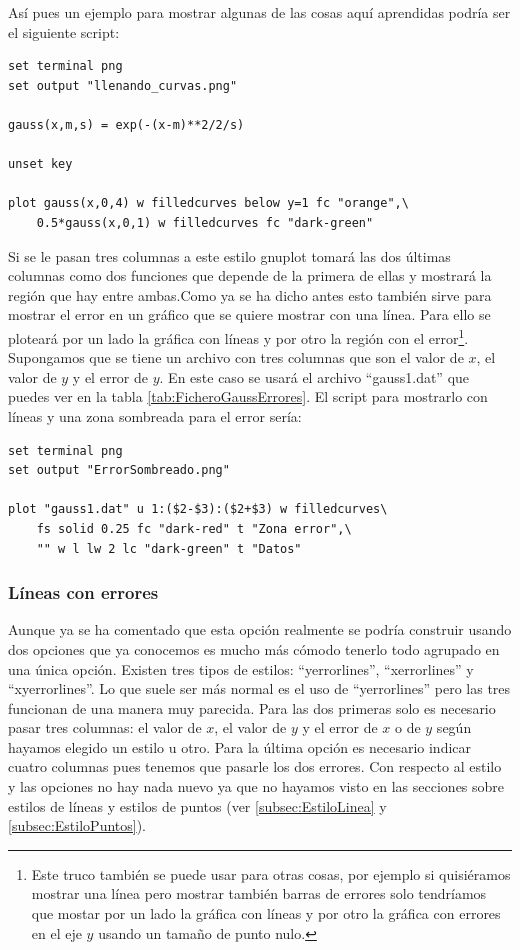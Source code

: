 \documentclass[11pt,a4paper,twoside,pdf]{article}
\numberwithin{equation}{section}
\begin{document}
Así pues un ejemplo para mostrar algunas de las cosas aquí aprendidas podría ser el siguiente script:

\begin{lstlisting}[language=Gnuplot]
set terminal png
set output "llenando_curvas.png"

gauss(x,m,s) = exp(-(x-m)**2/2/s)

unset key

plot gauss(x,0,4) w filledcurves below y=1 fc "orange",\
	0.5*gauss(x,0,1) w filledcurves fc "dark-green"
\end{lstlisting}

Si se le pasan tres columnas a este estilo gnuplot tomará las dos últimas columnas como dos funciones que depende de la primera de ellas y mostrará la región que hay entre ambas.Como ya se ha dicho antes esto también sirve para mostrar el error en un gráfico que se quiere mostrar con una línea. Para ello se ploteará por un lado la gráfica con líneas y por otro la región con el error\footnote{Este truco también se puede usar para otras cosas, por ejemplo si quisiéramos mostrar una línea pero mostrar también barras de errores solo tendríamos que mostar por un lado la gráfica con líneas y por otro la gráfica con errores en el eje $y$ usando un tamaño de punto nulo.}. Supongamos que se tiene un archivo con tres columnas que son el valor de $x$, el valor de $y$ y el error de $y$. En este caso se usará el archivo ``gauss1.dat'' que puedes ver en la tabla \ref{tab:FicheroGaussErrores}. El script para mostrarlo con líneas y una zona sombreada para el error sería:

\begin{lstlisting}[language=Gnuplot]
set terminal png
set output "ErrorSombreado.png"

plot "gauss1.dat" u 1:($2-$3):($2+$3) w filledcurves\
	fs solid 0.25 fc "dark-red" t "Zona error",\
	"" w l lw 2 lc "dark-green" t "Datos"
\end{lstlisting}

\subsubsection{Líneas con errores}

Aunque ya se ha comentado que esta opción realmente se podría construir usando dos opciones que ya conocemos es mucho más cómodo tenerlo todo agrupado en una única opción. Existen tres tipos de estilos: ``yerrorlines'', ``xerrorlines'' y ``xyerrorlines''. Lo que suele ser más normal es el uso de ``yerrorlines'' pero las tres funcionan de una manera muy parecida. Para las dos primeras solo es necesario pasar tres columnas: el valor de $x$, el valor de $y$ y el error de $x$ o de $y$ según hayamos elegido un estilo u otro. Para la última opción es necesario indicar cuatro columnas pues tenemos que pasarle los dos errores. Con respecto al estilo y las opciones no hay nada nuevo ya que no hayamos visto en las secciones sobre estilos de líneas y estilos de puntos (ver \ref{subsec:EstiloLinea} y \ref{subsec:EstiloPuntos}).
\end{document}
